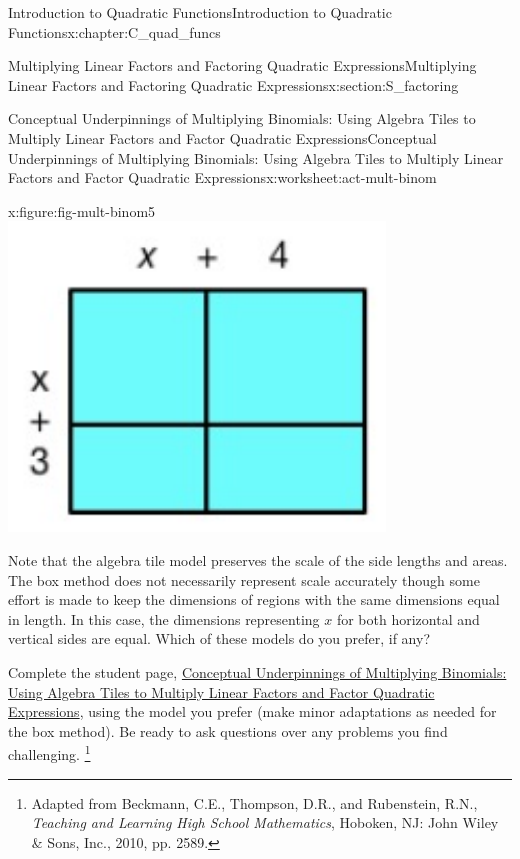 \documentclass[oneside,10pt,]{book}
\newcommand{\pubtitle}[1]{\textsl{#1}}
\numberwithin{equation}{chapter}
\begin{document}
\begin{chapterptx}{Introduction to Quadratic Functions}{}{Introduction to Quadratic Functions}{}{}{x:chapter:C_quad_funcs}
\begin{sectionptx}{Multiplying Linear Factors and Factoring Quadratic Expressions}{}{Multiplying Linear Factors and Factoring Quadratic Expressions}{}{}{x:section:S_factoring}
\begin{worksheet-subsection}{Conceptual Underpinnings of Multiplying Binomials: Using Algebra Tiles to Multiply Linear Factors and Factor Quadratic Expressions}{}{Conceptual Underpinnings of Multiplying Binomials: Using Algebra Tiles to Multiply Linear Factors and Factor Quadratic Expressions}{}{}{x:worksheet:act-mult-binom}
\begin{introduction}{}
\begin{sidebyside}{2}{0}{0}{0}
\begin{sbspanel}{0.5}
\begin{figureptx}{}{x:figure:fig-mult-binom5}{}
\includegraphics[width=\linewidth]{external/mult-binom5.pdf}
\tcblower
\end{figureptx}%
\end{sbspanel}%
\end{sidebyside}%
%
\par
Note that the algebra tile model preserves the scale of the side lengths and areas. The box method does not necessarily represent scale accurately though some effort is made to keep the dimensions of regions with the same dimensions equal in length. In this case, the dimensions representing \(x\) for both horizontal and vertical sides are equal. Which of these models do you prefer, if any?%
\par
Complete the student page, \hyperref[x:worksheet:act-mult-binom]{Conceptual Underpinnings of Multiplying Binomials: Using Algebra Tiles to Multiply Linear Factors and Factor Quadratic Expressions}, using the model you prefer (make minor adaptations as needed for the box method). Be ready to ask questions over any problems you find challenging. \footnote{Adapted from Beckmann, C.E., Thompson, D.R., and Rubenstein, R.N., \pubtitle{Teaching and Learning High School Mathematics}, Hoboken, NJ: John Wiley \& Sons, Inc., 2010, pp. 258\textemdash{}9.\label{g:fn:idp1711813656}}%
\par

\end{introduction}
\end{worksheet-subsection}
\end{sectionptx}
\end{chapterptx}
\end{document}
